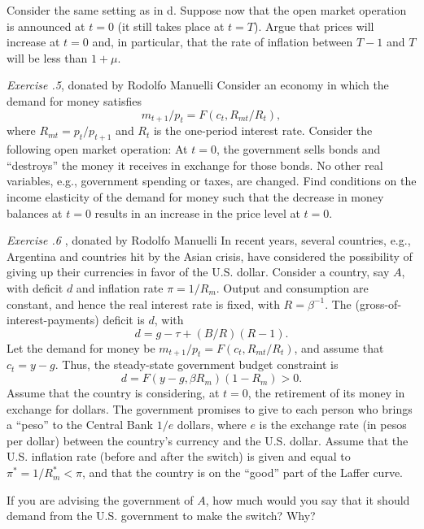   Consider the same setting as in d.  Suppose now that
the open market operation is announced at $t=0$ (it still takes
place at $t=T$).  Argue that prices will increase at $t=0$ and,
in particular, that the rate of inflation between $T-1$ and $T$
will be less than $1+\mu$.

\vfil\eject
\medskip
\noindent
{\it Exercise \the\chapternum.5}, donated by Rodolfo Manuelli
\medskip\noindent
Consider an economy in which the demand for money satisfies
$$ m_{t+1}/p_t = F(c_t, R_{mt}/R_t), $$
where $R_{mt} = p_t/p_{t+1}$ and $R_t$ is the one-period interest rate.
Consider the following open market operation: At $t=0$, the government
sells bonds and ``destroys'' the money it receives in exchange for those bonds.
No other real variables, e.g., government spending or taxes, are changed.
Find conditions on the income elasticity of the demand for money such
that the decrease in money balances at $t=0$ results in an increase in
the price level at $t=0$.


\medskip\noindent
{\it Exercise \the\chapternum.6} , donated by Rodolfo
Manuelli
\medskip\noindent
In recent years, several countries, e.g., Argentina and countries
hit by the Asian crisis, have considered the possibility of
giving up their currencies in favor of the U.S. dollar.  Consider a country,
say $A$, with deficit $d$ and inflation rate $\pi = 1/R_m$.  Output and
consumption are constant, and hence the real interest rate is fixed,
with $R = \beta^{-1}$.  The (gross-of-interest-payments) deficit is $d$, with
$$ d = g - \tau + (B/R)(R-1).  $$
Let the demand for money be $m_{t+1}/p_t = F(c_t, R_{mt}/R_t)$, and assume
that $c_t = y - g$.  Thus, the steady-state government budget constraint is
$$ d = F(y-g, \beta R_m)(1-R_m) > 0.  $$
Assume that the country is considering, at $t=0$, the retirement of its money
in exchange for dollars.  The government promises to give to each person who
brings a ``peso''
 to the Central Bank $1/e$ dollars, where $e$ is the exchange
rate (in pesos per dollar) between the country's currency and the U.S. dollar.
Assume that the U.S. inflation rate (before and after the switch) is given
and equal to $\pi^* = 1/R_m^* < \pi$, and that the country is on the ``good''
part of the Laffer curve.
\medskip


 If you are advising the government of $A$, how much would you
say that it should demand from the U.S. government to make the switch?  Why?
\medskip


